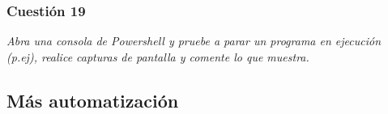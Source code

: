 \subsubsection{Cuestión 19}
\textit{Abra una consola de Powershell y pruebe a parar un programa en ejecución (p.ej), realice capturas de pantalla y comente lo que muestra.}

\subsection{Más automatización}


\newpage




